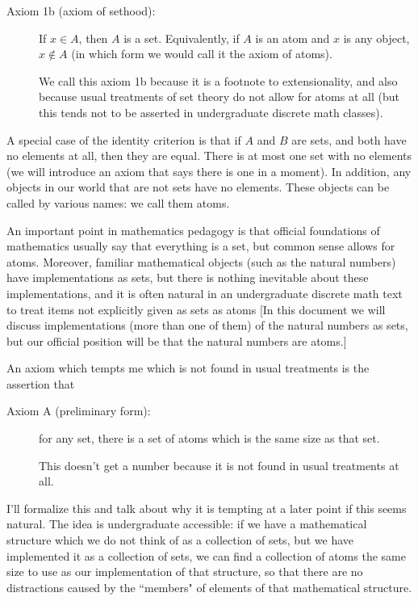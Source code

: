\documentclass[12pt]{article}
\begin{document}
\begin{description}
\begin{description}
\item[Axiom 1b (axiom of sethood):]  If $x \in A$, then $A$ is a set.  Equivalently, if $A$ is an atom and $x$ is any object, $x \not\in A$ (in which form we would call it the axiom of atoms).

We call this axiom 1b because it is a footnote to extensionality, and also because usual treatments of set theory do not allow for atoms at all (but this tends not to be asserted in undergraduate discrete math classes).
\end{description}

A special case of the identity criterion is that if $A$ and $B$ are sets, and both have no elements at all, then they are equal.   There is at most one set with no elements (we will introduce an axiom that says there is one in a moment).  In addition, any objects in our world that are not sets have no elements.  These objects can be called by various names:  we call them atoms.

An important point in mathematics pedagogy is that official foundations of mathematics usually say that everything is a set,  but common sense allows for atoms.  Moreover, familiar mathematical objects (such as the natural numbers) have implementations as sets, but there is nothing inevitable about these implementations, and it is often natural in an undergraduate discrete math text to treat items not explicitly given as sets as atoms [In this document we will discuss implementations (more than one of them) of the natural numbers as sets, but our official position will be that the natural numbers are atoms.]

An axiom which tempts me which is not found in usual treatments is the assertion that 

\begin{description}

\item[Axiom A (preliminary form):]  for any set, there is a set of atoms which is the same size as that set.  

This doesn't get a number because it is not found in usual treatments at all.

\end{description}

I'll formalize this and talk about why it is tempting at a later point if this seems natural.  The idea is undergraduate accessible:  if we have a mathematical structure which we do not think of as a collection of sets, but we have implemented it as a collection of sets, we can find a collection of atoms the same size to use as our implementation of that structure, so that there are no distractions caused by the ``members" of elements of that mathematical structure.


\end{description}
\end{document}
